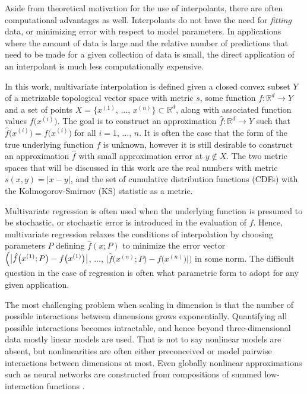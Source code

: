 \documentclass[smallextended,final]{svjour3}  %
\begin{document}
Aside from theoretical motivation for the use of interpolants, there
are often computational advantages as well. Interpolants do not have
the need for \textit{fitting} data, or minimizing error with respect
to model parameters. In applications where the amount of data is large
and the relative number of predictions that need to be made for a
given collection of data is small, the direct application of an
interpolant is much less computationally expensive.

In this work, multivariate interpolation is defined given a closed
convex subset $Y$ of a metrizable topological vector space with metric
$s$, some function $f:\mathbb{R}^d \rightarrow Y$ and a set of points
$X = \bigl\{x^{(1)}$, $\ldots$, $x^{(n)}\bigr\} \subset \mathbb{R}^d$,
along with associated function values $f\bigl(x^{(i)}\bigr)$. The goal
is to construct an approximation $\hat f: \mathbb{R}^d \rightarrow Y$
such that $\hat f\bigl(x^{(i)}\bigr) = f\bigl(x^{(i)}\bigr)$ for all
$i = 1$, $\ldots$, $n$. It is often the case that the form of the true
underlying function $f$ is unknown, however it is still desirable to
construct an approximation $\hat f$ with small approximation error at
$y \notin X$. The two metric spaces that will be discussed in this
work are the real numbers with metric $s(x,y) = |x-y|$, and the set of
cumulative distribution functions (CDFs) with the Kolmogorov-Smirnov
(KS) statistic \cite{lilliefors1967kolmogorov} as a metric.

Multivariate regression is often used when the underlying function is
presumed to be stochastic, or stochastic error is introduced in the
evaluation of $f$. Hence, multivariate regression relaxes the
conditions of interpolation by choosing parameters $P$ defining $\hat
f(x;P)$ to minimize the error vector $\Bigl( \bigl | \hat f
\bigl(x^{(1)};P\bigr) - f\bigl(x^{(1)}\bigr) \bigr|$, $\ldots$, $\bigl
| \hat f \bigl(x^{(n)}; P\bigr) - f\bigl(x^{(n)}\bigr) \bigr | \Bigr)$
in some norm. The difficult question in the case of regression is
often what parametric form to adopt for any given application.

The most challenging problem when scaling in dimension is that the
number of possible interactions between dimensions grows
exponentially. Quantifying all possible interactions becomes
intractable, and hence beyond three-dimensional data mostly linear
models are used. That is not to say nonlinear models are absent, but
nonlinearities are often either preconceived or model pairwise
interactions between dimensions at most. Even globally nonlinear
approximations such as neural networks are constructed from
compositions of summed low-interaction functions
\cite{clevert2015fast}.
\end{document}
